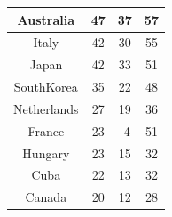 \documentclass{mcmthesis}
\begin{document}
\begin{table}
\begin{tabular}{|c|ccc|}
\hline
{\cellcolor[rgb]{0.992,0.737,0.529}}Australia                                                                    & 47                                                              & 37                                      & 57                                       \\ 
\hline
\rowcolor[rgb]{1,0.824,0.635} {\cellcolor[rgb]{0.992,0.737,0.529}}Italy                                          & 42                                                              & 30                                      & 55                                       \\ 
\hline
{\cellcolor[rgb]{0.992,0.737,0.529}}Japan                                                                        & 42                                                              & 33                                      & 51                                       \\ 
\hline
\rowcolor[rgb]{1,0.824,0.635} {\cellcolor[rgb]{0.992,0.737,0.529}}SouthKorea                                     & 35                                                              & 22                                      & 48                                       \\ 
\hline
{\cellcolor[rgb]{0.992,0.737,0.529}}Netherlands                                                                  & 27                                                              & 19                                      & 36                                       \\ 
\hline
\rowcolor[rgb]{1,0.824,0.635} {\cellcolor[rgb]{0.992,0.737,0.529}}France                                         & 23                                                              & -4                                      & 51                                       \\ 
\hline
{\cellcolor[rgb]{0.992,0.737,0.529}}Hungary                                                                      & 23                                                              & 15                                      & 32                                       \\ 
\hline
\rowcolor[rgb]{1,0.824,0.635} {\cellcolor[rgb]{0.992,0.737,0.529}}Cuba                                           & 22                                                              & 13                                      & 32                                       \\ 
\hline
{\cellcolor[rgb]{0.992,0.737,0.529}}Canada                                                                       & 20                                                              & 12                                      & 28                                       \\ 

\end{tabular}
\end{table}
\end{document}
